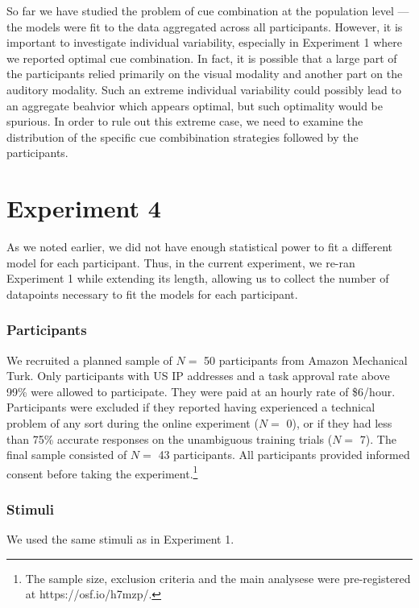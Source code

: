\documentclass[english,,man,floatsintext]{apa6}
\let\rmarkdownfootnote\footnote%
\def\footnote{\protect\rmarkdownfootnote}
\theoremstyle{definition}
\theoremstyle{definition}
\theoremstyle{definition}
\theoremstyle{remark}
\begin{document}
So far we have studied the problem of cue combination at the population
level --- the models were fit to the data aggregated across all
participants. However, it is important to investigate individual
variability, especially in Experiment 1 where we reported optimal cue
combination. In fact, it is possible that a large part of the
participants relied primarily on the visual modality and another part on
the auditory modality. Such an extreme individual variability could
possibly lead to an aggregate beahvior which appears optimal, but such
optimality would be spurious. In order to rule out this extreme case, we
need to examine the distribution of the specific cue combibination
strategies followed by the participants.

\section{Experiment 4}\label{experiment-4}

As we noted earlier, we did not have enough statistical power to fit a
different model for each participant. Thus, in the current experiment,
we re-ran Experiment 1 while extending its length, allowing us to
collect the number of datapoints necessary to fit the models for each
participant.

\subsubsection{Participants}\label{participants-3}

We recruited a planned sample of \(N=\) 50 participants from Amazon
Mechanical Turk. Only participants with US IP addresses and a task
approval rate above 99\% were allowed to participate. They were paid at
an hourly rate of \$6/hour. Participants were excluded if they reported
having experienced a technical problem of any sort during the online
experiment (\(N=\) 0), or if they had less than 75\% accurate responses
on the unambiguous training trials (\(N=\) 7). The final sample
consisted of \(N =\) 43 participants. All participants provided informed
consent before taking the
experiment.\footnote{The sample size, exclusion criteria and the main analysese were pre-registered at https://osf.io/h7mzp/.}

\subsubsection{Stimuli}\label{stimuli-1}

We used the same stimuli as in Experiment 1.
\end{document}
